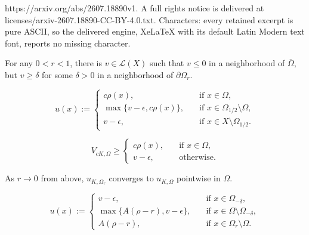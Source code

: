 \documentclass[10pt,a4paper]{amsart}
\begin{document}
https://arxiv.org/abs/2607.18890v1. A full rights notice is delivered at licenses/arxiv-2607.18890-CC-BY-4.0.txt. Characters: every retained excerpt is pure ASCII, so the delivered engine, XeLaTeX with its default Latin Modern text font, reports no missing character.
	\begin{lem}\label{lem_extr_fun_lem2}
		For any $0 < r < 1$, there is $v \in \mathscr{L}(X)$ such that $v \leq 0$ in a neighborhood of $\overline{\Omega}$, but $v \geq \delta$ for some $\delta > 0$ in a neighborhood of $\partial \Omega_r$.
	\end{lem}

		\begin{equation}\label{eq_part_def_u_psh}
			u(x) 
			:=
			\begin{cases}
				c \rho(x), \quad &\text{if } x \in \Omega,
				\\
				\max \big\{ v - \epsilon,  c \rho(x) \big\}, \quad &\text{if } x \in \Omega_{1/2} \setminus \Omega,
				\\
				v - \epsilon, \quad &\text{if } x \in X \setminus \Omega_{1/2}.
			\end{cases} 
		\end{equation}

		\begin{equation}\label{eq_vck_low_bnd}
			V_{c K, \Omega}
			\geq
			\begin{cases}
				c \rho(x), \quad &\text{if } x \in \Omega,
				\\
				v - \epsilon, \quad &\text{otherwise.}
			\end{cases} 
		\end{equation}

	\begin{lem}\label{eq_rel_extr_f}
		As $r \to 0$ from above, $u_{K, \Omega_r}$ converges to $u_{K, \Omega}$ pointwise in $\Omega$.
	\end{lem}

		\begin{equation}\label{eq_u_cnt_ur}
			u(x) 
			:=
			\begin{cases}
				v - \epsilon, \quad &\text{if } x \in \Omega_{-\delta},
				\\
				\max \big\{ A (\rho - r),  v - \epsilon \big\}, \quad &\text{if } x \in \Omega \setminus \Omega_{-\delta},
				\\
				A(\rho - r), \quad &\text{if } x \in \Omega_r \setminus \Omega.
			\end{cases} 
		\end{equation}
\end{document}
